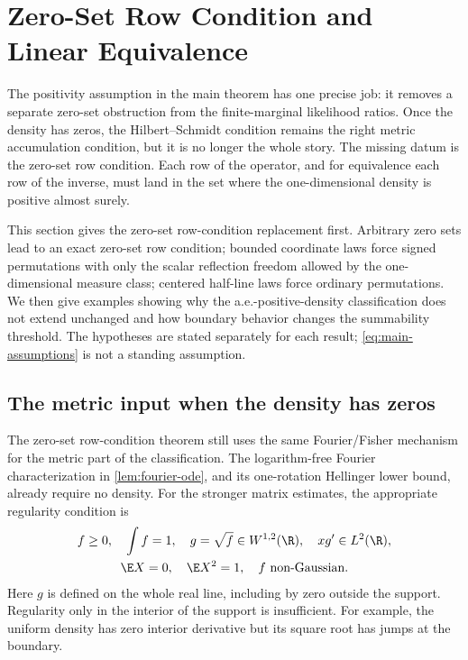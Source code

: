 \section{Zero-Set Row Condition and Linear Equivalence}
\label{sec:zero-set-row-condition-and-linear-equivalence}

The positivity assumption in the main theorem has one precise job: it
removes a separate zero-set obstruction from the finite-marginal likelihood
ratios.
Once the density has zeros, the Hilbert--Schmidt condition remains the right
metric accumulation condition, but it is no longer the whole story.
The missing datum is the zero-set row condition.
Each row of the operator, and for equivalence each row of the inverse, must
land in the set where the one-dimensional density is positive almost surely.

This section gives the zero-set row-condition replacement first.
Arbitrary zero sets lead to an exact zero-set row condition; bounded
coordinate laws force signed permutations with only the scalar reflection
freedom allowed by the one-dimensional measure class; centered half-line laws
force ordinary permutations.
We then give examples showing why the a.e.-positive-density classification
does not extend unchanged and how boundary behavior changes the summability
threshold.
The hypotheses are stated separately for each result;
\eqref{eq:main-assumptions} is not a standing assumption.

\subsection{The metric input when the density has zeros}
\label{sec:metric-input-with-density-zeros}

The zero-set row-condition theorem still uses the same Fourier/Fisher mechanism for
the metric part of the classification.
The logarithm-free Fourier characterization in \cref{lem:fourier-ode}, and
its one-rotation Hellinger lower bound, already require no density.
For the stronger matrix estimates, the appropriate regularity condition is
\begin{equation}
 \begin{gathered}
 f\geq0,\quad \int f=1,\quad
 g=\sqrt f\in W^{1,2}(\R),\quad xg'\in L^2(\R),\\
 \E X=0,\quad \E X^2=1,\quad f\text{ non-Gaussian}.
 \end{gathered}
 \label{eq:zero-set-row-assumptions}
\end{equation}
Here \(g\) is defined on the whole real line, including by zero outside
the support.
Regularity only in the interior of the support is insufficient.
For example, the uniform density has zero interior derivative but its
square root has jumps at the boundary.

